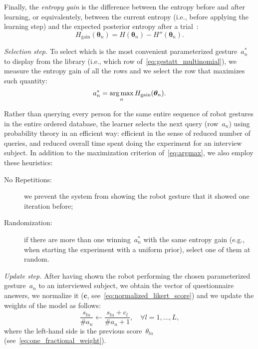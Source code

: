 Finally, the \emph{entropy gain} is the difference between the entropy before and after learning, or equivalentely, between the current entropy (i.e., before applying the learning step) and the expected posterior entropy after a trial~\cite[Eq.~7]{tong:2000}:
\begin{equation} \label{eq:entropy_gain}
H_{\text{gain}}(\bm{\theta}_n) = H(\bm{\theta}_n) - H''(\bm{\theta}_n).
\end{equation}

\emph{Selection step.} To select which is the most convenient parameterized gesture~$a_n^{*}$ to display from the library (i.e., which row of~\eqref{eq:gestatt_multinomial}), we measure the entropy gain of all the rows and we select the row that maximizes such quantity:
\begin{equation} \label{eq:argmax}
a_n^{*} = \operatorname*{arg\,max}_n H_{\text{gain}}(\bm{\theta}_n).
\end{equation}

Rather than querying every person for the same entire sequence of robot gestures in the entire ordered database, the learner selects the next query (row~$a_n$) using probability theory in an efficient way: efficient in the sense of reduced number of queries, and reduced overall time spent doing the experiment for an interview subject. In addition to the maximization criterion of~\eqref{eq:argmax}, we also employ these heuristics:
\begin{description}
\item[No Repetitions:] we prevent the system from showing the robot gesture that it showed one iteration before;

\item[Randomization:] if there are more than one winning~$a_n^{*}$ with the same entropy gain (e.g., when starting the experiment with a uniform prior), select one of them at random.
\end{description}

\emph{Update step.} After having shown the robot performing the chosen parameterized gesture~$a_n$ to an interviewed subject, we obtain the vector of questionnaire answers, we normalize it ($\bm{c}$, see~\eqref{eq:normalized_likert_score}) and we update the weights of the model as follows:
\begin{equation} \label{eq:update_rule}
\frac{s_{ln}}{\#a_n} \leftarrow \frac{s_{ln} + c_l}{\#a_n + 1}, \quad \forall l=1,\ldots,L,
\end{equation}
where the left-hand side is the previous score~$\theta_{ln}$ (see~\eqref{eq:one_fractional_weight}).

